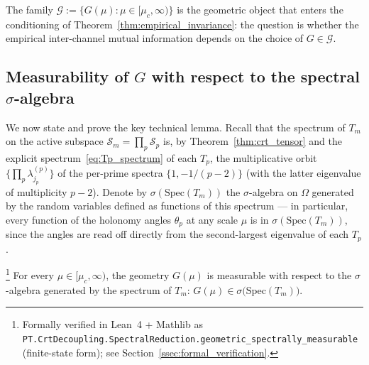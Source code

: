 The family $\mathcal{G} := \{ G(\mu) : \mu \in [\mu_c, \infty) \}$
is the geometric object that enters the conditioning of
Theorem~\ref{thm:empirical_invariance}: the question is whether the
empirical inter-channel mutual information depends on the choice of
$G \in \mathcal{G}$.

\subsection{Measurability of $G$ with respect to the spectral
$\sigma$-algebra}
\label{ssec:G_measurability}

We now state and prove the key technical lemma. Recall that the
spectrum of $T_m$ on the active subspace
$\mathcal{S}_m = \prod_p \mathcal{S}_p$ is, by
Theorem~\ref{thm:crt_tensor} and the explicit
spectrum~\eqref{eq:Tp_spectrum} of each $T_p$, the multiplicative
orbit $\{\prod_p \lambda^{(p)}_{j_p}\}$ of the per-prime spectra
$\{1, -1/(p-2)\}$ (with the latter eigenvalue of multiplicity
$p - 2$). Denote by $\sigma(\mathrm{Spec}(T_m))$ the
$\sigma$-algebra on $\Omega$ generated by the random variables
defined as functions of this spectrum --- in particular, every
function of the holonomy angles $\theta_p$ at any scale $\mu$ is
in $\sigma(\mathrm{Spec}(T_m))$, since the angles are read off
directly from the second-largest eigenvalue of each $T_p$.

\begin{lemma}
\label{lem:G_measurable}
\footnote{Formally verified in Lean~4 + Mathlib as
\texttt{PT.CrtDecoupling.SpectralReduction.geometric\_spectrally\_measurable}
(finite-state form); see Section~\ref{ssec:formal_verification}.}
For every $\mu \in [\mu_c, \infty)$, the geometry $G(\mu)$ is
measurable with respect to the $\sigma$-algebra generated by the
spectrum of $T_m$:
$G(\mu) \in \sigma\bigl(\mathrm{Spec}(T_m)\bigr)$.
\end{lemma}


